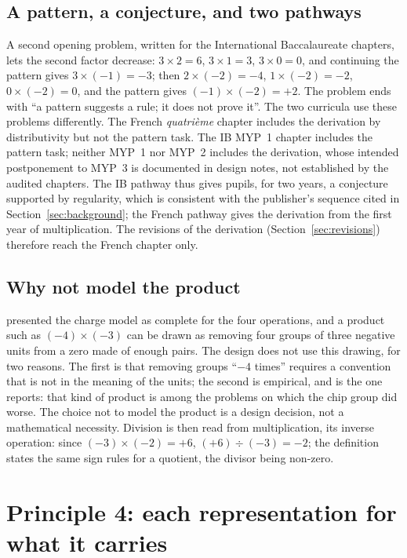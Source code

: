 \documentclass[11pt,a4paper]{article}
\theoremstyle{definition}
\begin{document}
\subsection{A pattern, a conjecture, and two pathways}
A second opening problem, written for the International Baccalaureate chapters, lets the second factor decrease: $3\times2=6$, $3\times1=3$, $3\times0=0$, and continuing the pattern gives $3\times(-1)=-3$; then $2\times(-2)=-4$, $1\times(-2)=-2$, $0\times(-2)=0$, and the pattern gives $(-1)\times(-2)=+2$. The problem ends with ``a pattern suggests a rule; it does not prove it''. The two curricula use these problems differently. The French \emph{quatri\`eme} chapter includes the derivation by distributivity but not the pattern task. The IB MYP~1 chapter includes the pattern task; neither MYP~1 nor MYP~2 includes the derivation, whose intended postponement to MYP~3 is documented in design notes, not established by the audited chapters. The IB pathway thus gives pupils, for two years, a conjecture supported by regularity, which is consistent with the publisher's sequence cited in Section~\ref{sec:background}; the French pathway gives the derivation from the first year of multiplication. The revisions of the derivation (Section~\ref{sec:revisions}) therefore reach the French chapter only.

\subsection{Why not model the product}
\citet{Battista1983} presented the charge model as complete for the four operations, and a product such as $(-4)\times(-3)$ can be drawn as removing four groups of three negative units from a zero made of enough pairs. The design does not use this drawing, for two reasons. The first is that removing groups ``$-4$ times'' requires a convention that is not in the meaning of the units; the second is empirical, and is the one \citet{NurnbergerHaag2015PMENA} reports: that kind of product is among the problems on which the chip group did worse. The choice not to model the product is a design decision, not a mathematical necessity. Division is then read from multiplication, its inverse operation: since $(-3)\times(-2)=+6$, $(+6)\div(-3)=-2$; the definition states the same sign rules for a quotient, the divisor being non-zero.

\section{Principle 4: each representation for what it carries}\label{sec:p4}
\end{document}
